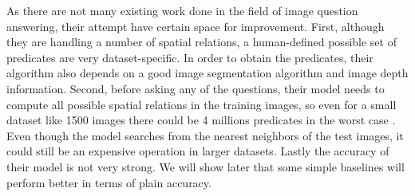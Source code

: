 \documentclass{article}
\renewcommand{\#}[1]{\textbf{#1}}
\begin{document}
As there are not many existing work done in the field of image question answering, their attempt have certain space for improvement. First, although they are handling a number of spatial relations, a human-defined possible set of predicates are very dataset-specific. In order to obtain the predicates, their algorithm also depends on a good image segmentation algorithm and image depth information. Second, before asking any of the questions, their model needs to compute all possible spatial relations in the training images, so even for a small dataset like 1500 images there could be 4 millions predicates in the worst case \cite{malinowski14b}. Even though the model searches from the nearest neighbors of the test images, it could still be an expensive operation in larger datasets. Lastly the accuracy of their model is not very strong. We will show later that some simple baselines will perform better in terms of plain accuracy.
\end{document}
